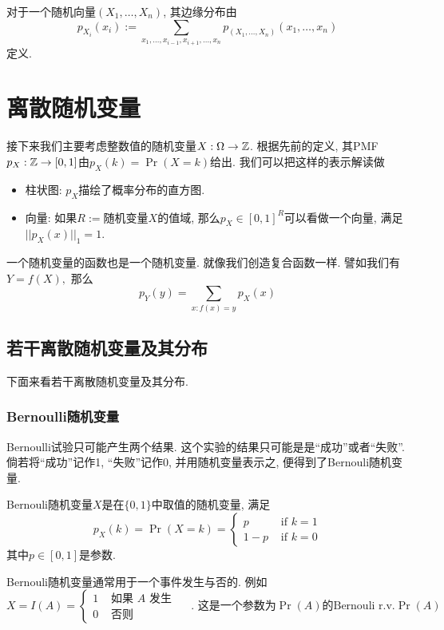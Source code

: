 \documentclass{ctexart}
\begin{document}
\begin{definition}[边缘分布]
    对于一个随机向量$\left(X_1, \ldots, X_n\right)$, 其边缘分布由$$
p_{X_i}\left(x_i\right):=\sum_{x_1, \ldots, x_{i-1}, x_{i+1}, \ldots, x_n} p_{\left(X_1, \ldots, X_n\right)}\left(x_1, \ldots, x_n\right)
$$
定义. 

\end{definition}

\section{离散随机变量}

接下来我们主要考虑整数值的随机变量$X: \Omega \to {\mathbb Z}$. 根据先前的定义, 其PMF $p_X:{\mathbb Z}\to[0,1]$由$p_X(k)=\operatorname{Pr}(X=k)$给出. 我们可以把这样的表示解读做
\begin{itemize}
    \item 柱状图: $p_X$描绘了概率分布的直方图.
\item 向量: 如果$R:=$随机变量$X$的值域, 那么$p_X\in [0,1]^R$可以看做一个向量, 满足$||p_X(x)||_1=1$. 
\end{itemize}

一个随机变量的函数也是一个随机变量. 就像我们创造复合函数一样. 譬如我们有$Y=f(X),$ 那么$$
p_Y(y)=\sum_{x: f(x)=y} p_X(x)
$$
\subsection{若干离散随机变量及其分布} 下面来看若干离散随机变量及其分布. 

\subsubsection{Bernoulli随机变量} Bernoulli试验只可能产生两个结果. 这个实验的结果只可能是是``成功''或者``失败''. 倘若将``成功''记作1, ``失败''记作0, 并用随机变量表示之, 便得到了Bernouli随机变量. 

\begin{definition}[Bernouli随机变量]
    Bernouli随机变量$X$是在$\{ 0, 1 \}$中取值的随机变量, 满足
    $$
p_X(k)=\operatorname{Pr}(X=k)= \begin{cases}p & \text { if } k=1 \\ 1-p & \text { if } k=0\end{cases}
$$
其中$p\in [0,1]$是参数. 
\end{definition}

Bernouli随机变量通常用于一个事件发生与否的. 例如
$$
X=I(A)=\left\{\begin{array}{ll}
1 & \text { 如果 } A \text { 发生 } \\
0 & \text { 否则 }
\end{array} \quad \text {. 这是一个参数为$\Pr(A)$的Bernouli r.v.} \operatorname{Pr}(A)\right.
$$
\end{document}
